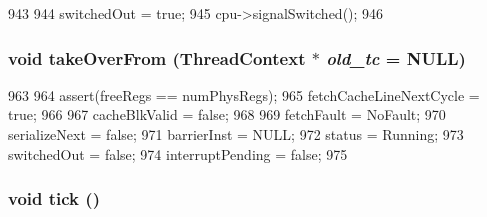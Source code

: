 \begin{DoxyCode}
943 {
944     switchedOut = true;
945     cpu->signalSwitched();
946 }
\end{DoxyCode}
\hypertarget{classFrontEnd_a5a901e7ec5b94a55bd61fde88ad0b7f1}{
\subsubsection[{takeOverFrom}]{\setlength{\rightskip}{0pt plus 5cm}void takeOverFrom ({\bf ThreadContext} $\ast$ {\em old\_\-tc} = {\ttfamily NULL})}}
\label{classFrontEnd_a5a901e7ec5b94a55bd61fde88ad0b7f1}



\begin{DoxyCode}
963 {
964     assert(freeRegs == numPhysRegs);
965     fetchCacheLineNextCycle = true;
966 
967     cacheBlkValid = false;
968 
969     fetchFault = NoFault;
970     serializeNext = false;
971     barrierInst = NULL;
972     status = Running;
973     switchedOut = false;
974     interruptPending = false;
975 }
\end{DoxyCode}
\hypertarget{classFrontEnd_a873dd91783f9efb4a590aded1f70d6b0}{
\subsubsection[{tick}]{\setlength{\rightskip}{0pt plus 5cm}void tick ()}}
\label{classFrontEnd_a873dd91783f9efb4a590aded1f70d6b0}



